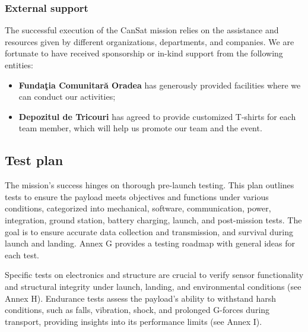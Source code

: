 \subsubsection{External support}
The successful execution of the CanSat mission relies on the assistance and resources given by different organizations, departments, and companies. We are fortunate to have received sponsorship or in-kind support from the following entities:
\begin{itemize}[leftmargin=1cm, itemindent=0.25cm, noitemsep, topsep=0pt, label=$\bullet$]
    \item \textbf{Funda\c{t}ia Comunitar\u{a} Oradea} has generously provided facilities where we can conduct our activities;
    \item \textbf{Depozitul de Tricouri} has agreed to provide customized T-shirts for each team member, which will help us promote our team and the event.
\end{itemize}


\subsection{Test plan}

The mission's success hinges on thorough pre-launch testing. This plan outlines tests to ensure the payload meets objectives and functions under various conditions, categorized into mechanical, software, communication, power, integration, ground station, battery charging, launch, and post-mission tests. The goal is to ensure accurate data collection and transmission, and survival during launch and landing. Annex G provides a testing roadmap with general ideas for each test.

Specific tests on electronics and structure are crucial to verify sensor functionality and structural integrity under launch, landing, and environmental conditions (see Annex H). Endurance tests assess the payload's ability to withstand harsh conditions, such as falls, vibration, shock, and prolonged G-forces during transport, providing insights into its performance limits (see Annex I).

